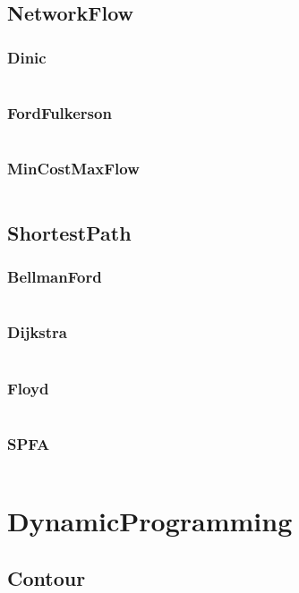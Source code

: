 \documentclass[a4paper,11pt]{article}
\begin{document}
\subsection{NetworkFlow}
\subsubsection{Dinic}
\inputminted[breaklines]{c++}{M/我的模板/04++GraphTheory/+NetworkFlow/+Dinic.cpp}
\subsubsection{FordFulkerson}
\inputminted[breaklines]{c++}{M/我的模板/04++GraphTheory/+NetworkFlow/+FordFulkerson.cpp}
\subsubsection{MinCostMaxFlow}
\inputminted[breaklines]{c++}{M/我的模板/04++GraphTheory/+NetworkFlow/+MinCostMaxFlow.cpp}

\subsection{ShortestPath}
\subsubsection{BellmanFord}
\inputminted[breaklines]{c++}{M/我的模板/04++GraphTheory/+ShortestPath/+BellmanFord.cpp}
\subsubsection{Dijkstra}
\inputminted[breaklines]{c++}{M/我的模板/04++GraphTheory/+ShortestPath/+Dijkstra.cpp}
\subsubsection{Floyd}
\inputminted[breaklines]{c++}{M/我的模板/04++GraphTheory/+ShortestPath/+Floyd.cpp}
\subsubsection{SPFA}
\inputminted[breaklines]{c++}{M/我的模板/04++GraphTheory/+ShortestPath/+SPFA.cpp}


\newpage
\section{DynamicProgramming}
\subsection{Contour}
\inputminted[breaklines]{c++}{M/我的模板/05++DynamicProgramming/+Contour.cpp}
\end{document}
